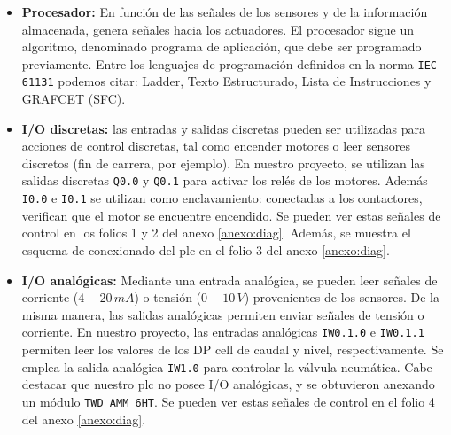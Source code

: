 \begin{itemize}
 \item \textbf{Procesador:} En función de las señales de los sensores y de la 
información almacenada, genera señales hacia los actuadores. El procesador 
sigue un algoritmo, denominado programa de aplicación, que debe ser programado 
previamente. Entre los lenguajes de programación definidos en la norma 
\verb|IEC 61131| podemos citar: Ladder, Texto Estructurado, Lista de 
Instrucciones y GRAFCET (SFC).
 \item \textbf{I/O discretas:} las entradas y salidas discretas pueden ser 
utilizadas para acciones de control discretas, tal como encender motores o leer 
sensores discretos (fin de carrera, por ejemplo). En nuestro proyecto, se 
utilizan las salidas discretas \verb|Q0.0| y \verb|Q0.1| para activar los relés 
de los motores. Además \verb|I0.0| e \verb|I0.1| se utilizan como 
enclavamiento: conectadas a los contactores, verifican que el motor se 
encuentre encendido. Se pueden ver estas señales de control en los folios 1 y 2 
del anexo \ref{anexo:diag}. Además, se muestra el esquema de conexionado del 
\gls{plc} en el folio 3 del anexo \ref{anexo:diag}.
\item \textbf{I/O analógicas:}  Mediante una entrada 
analógica, se pueden leer 
señales de corriente ($4-20\,mA$) o tensión ($0-10\,V$) provenientes de los 
sensores. De la misma manera, las salidas analógicas permiten enviar señales de 
tensión o corriente. En nuestro proyecto, las entradas 
analógicas \verb|IW0.1.0| e \verb|IW0.1.1| permiten leer los valores de los 
DP cell de caudal y nivel, respectivamente. Se emplea la salida analógica 
\verb|IW1.0| para controlar la válvula 
neumática. Cabe destacar que nuestro \gls{plc} 
no posee I/O analógicas, y se obtuvieron anexando un módulo \verb|TWD AMM 6HT|.
Se pueden ver estas señales de control en el folio 4 del anexo \ref{anexo:diag}.


\end{itemize}
